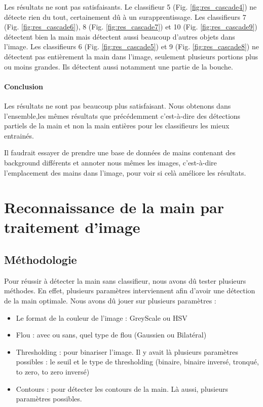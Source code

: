 \documentclass[11pt]{article}
\begin{document}
Les résultats ne sont pas satisfaisants. Le classifieur 5 (Fig. \ref{fig:res_cascade4}) ne détecte rien du tout, certainement dû à un surapprentissage. Les classifieurs 7 (Fig. \ref{fig:res_cascade6}), 8 (Fig. \ref{fig:res_cascade7}) et 10 (Fig. \ref{fig:res_cascade9}) détectent bien la main mais détectent aussi beaucoup d'autres objets dans l'image. Les classifieurs 6 (Fig. \ref{fig:res_cascade5}) et 9 (Fig. \ref{fig:res_cascade8}) ne détectent pas entièrement la main dans l'image, seulement plusieurs portions plus ou moins grandes. Ils détectent aussi notamment une partie de la bouche. 

\paragraph{Conclusion}
Les résultats ne sont pas beaucoup plus satisfaisant. Nous obtenons dans l'ensemble,les mêmes résultats que précédemment c'est-à-dire des détections partiels de la main et non la main entières pour les classifieurs les mieux entrainés.

Il faudrait essayer de prendre une base de données de mains contenant des background différents et annoter nous mêmes les images, c'est-à-dire l'emplacement des mains dans l'image, pour voir si celà améliore les résultats. 

\section{Reconnaissance de la main par traitement d'image}
\subsection{Méthodologie}
Pour réussir à détecter la main sans classifieur, nous avons dû tester plusieurs méthodes. En effet, plusieurs paramètres interviennent afin d'avoir une détection de la main optimale.
Nous avons dû jouer sur plusieurs paramètres :
\begin{itemize}[label=-]
    \item Le format de la couleur de l'image : GreyScale ou HSV
    \item Flou : avec ou sans, quel type de flou (Gaussien ou Bilatéral)
    \item Thresholding : pour binariser l'image. Il y avait là plusieurs paramètres possibles : le seuil et le type de thresholding (binaire, binaire inversé, tronqué, to zero, to zero inversé)
    \item Contours : pour détecter les contours de la main. Là aussi, plusieurs paramètres possibles.
\end{itemize}
\end{document}
